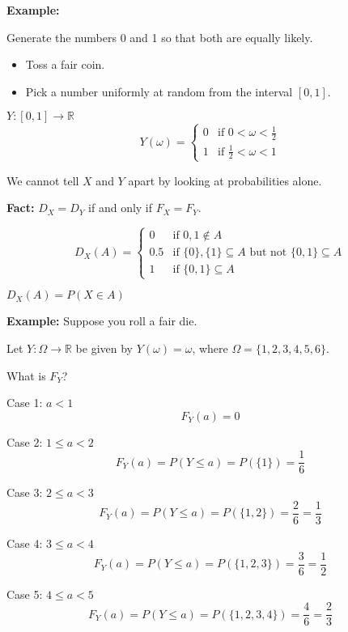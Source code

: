 \documentclass{article}
\begin{document}
    \textbf{Example:}

    Generate the numbers 0 and 1 so that both are equally likely.
    \begin{itemize}
        \item Toss a fair coin.
        \item Pick a number uniformly at random from the interval \([0, 1]\).
    \end{itemize}

    \(Y: [0, 1] \rightarrow \mathbb{R}\)
    \[
        Y(\omega) = 
        \begin{cases} 
            0 & \text{if } 0 < \omega < \frac{1}{2} \\
            1 & \text{if } \frac{1}{2} < \omega < 1 
        \end{cases}
    \]

    We cannot tell \(X\) and \(Y\) apart by looking at probabilities alone.

    \textbf{Fact:} \(D_X = D_Y\) if and only if \(F_X = F_Y\).

    \[
        D_X(A) = 
        \begin{cases} 
            0 & \text{if } 0, 1 \not\in A \\
            0.5 & \text{if } \{0\}, \{1\} \subseteq A \text{ but not } \{0, 1\} \subseteq A \\
            1 & \text{if } \{0, 1\} \subseteq A 
        \end{cases}
    \]

    \(D_X(A) = P(X \in A)\)

    \textbf{Example:} Suppose you roll a fair die.

    Let \(Y: \Omega \rightarrow \mathbb{R}\) be given by \(Y(\omega) = \omega\), where \(\Omega = \{1, 2, 3, 4, 5, 6\}\).

    What is \(F_Y\)?

    Case 1: \(a < 1\)
    \[
        F_Y(a) = 0
    \]

    Case 2: \(1 \leq a < 2\)
    \[
        F_Y(a) = P(Y \leq a) = P(\{1\}) = \frac{1}{6}
    \]

    Case 3: \(2 \leq a < 3\)
    \[
        F_Y(a) = P(Y \leq a) = P(\{1, 2\}) = \frac{2}{6} = \frac{1}{3}
    \]

    Case 4: \(3 \leq a < 4\)
    \[
        F_Y(a) = P(Y \leq a) = P(\{1, 2, 3\}) = \frac{3}{6} = \frac{1}{2}
    \]

    Case 5: \(4 \leq a < 5\)
    \[
        F_Y(a) = P(Y \leq a) = P(\{1, 2, 3, 4\}) = \frac{4}{6} = \frac{2}{3}
    \]
\end{document}
